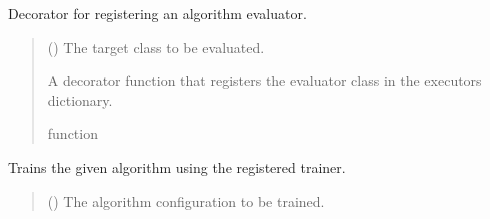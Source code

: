 \documentclass[letterpaper,10pt,english]{sphinxmanual}
\begin{document}
\begin{fulllineitems}
\begin{fulllineitems}
\label{\detokenize{modules:application.services.AlgorithmManager.AlgorithmManager.evaluator_for}}
\pysigstartsignatures
{}
\pysigstopsignatures
\sphinxAtStartPar
Decorator for registering an algorithm evaluator.
\begin{quote}\begin{description}
\sphinxAtStartPar
{} ({\hyperref[\detokenize{modules:domain.interfaces.AlgorithmEvaluate.AlgorithmEvaluate}]{}}) \textendash{} The target class to be evaluated.

\sphinxAtStartPar
A decorator function that registers the evaluator class in the executors dictionary.

\sphinxAtStartPar
function

\end{description}\end{quote}

\end{fulllineitems}


\begin{fulllineitems}
\label{\detokenize{modules:application.services.AlgorithmManager.AlgorithmManager.train}}
\pysigstartsignatures
{}
\pysigstopsignatures
\sphinxAtStartPar
Trains the given algorithm using the registered trainer.
\begin{quote}\begin{description}
\sphinxAtStartPar
{} ({\hyperref[\detokenize{modules:domain.interfaces.AlgorithmConfigurator.AlgorithmConfigurator}]{}}) \textendash{} The algorithm configuration to be trained.


\end{description}
\end{quote}
\end{fulllineitems}
\end{fulllineitems}
\end{document}
